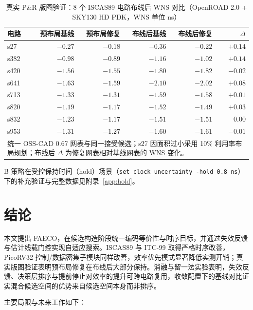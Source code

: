 \documentclass[journal]{IEEEtran}
\begin{document}
\begin{table}[!t]
\centering
\caption{真实 P\&R 版图验证：8 个 ISCAS89 电路布线后 WNS 对比（OpenROAD 2.0 + SKY130 HD PDK，WNS 单位 ns）}
\label{tab:pr8}
\footnotesize
\setlength{\tabcolsep}{2.5pt}
\begin{tabular}{lrrrrr}
\toprule
\textbf{电路} & \textbf{预布局基线} & \textbf{预布局修复} & \textbf{布线后基线} & \textbf{布线后修复} & $\Delta$ \\
\midrule
s27  & $-0.27$ & $-0.18$ & $-0.36$ & $-0.22$ & $+0.14$ \\
s382 & $-0.98$ & $-0.89$ & $-1.16$ & $-1.02$ & $+0.14$ \\
s420 & $-1.56$ & $-1.55$ & $-1.80$ & $-1.82$ & $-0.02$ \\
s641 & $-1.63$ & $-1.59$ & $-2.10$ & $-2.02$ & $+0.08$ \\
s713 & $-1.33$ & $-1.31$ & $-1.59$ & $-1.58$ & $+0.01$ \\
s820 & $-1.19$ & $-1.17$ & $-1.52$ & $-1.49$ & $+0.03$ \\
s832 & $-1.23$ & $-1.17$ & $-1.51$ & $-1.51$ & $0.00$ \\
s953 & $-1.31$ & $-1.27$ & $-1.60$ & $-1.61$ & $-0.01$ \\
\bottomrule
\multicolumn{6}{p{0.92\columnwidth}}{\footnotesize 统一 OSS-CAD 0.67 网表与同一接受候选；s27 因面积过小采用 10\% 利用率布局规划；布线后 $\Delta$ 为修复网表相对基线网表的 WNS 变化。}\\
\end{tabular}
\end{table}





B 策略在受控保持时间（hold）场景（\texttt{set\_clock\_uncertainty -hold 0.8\,ns}）下的补充验证与完整数据见附录~\ref{app:hold}。

\section{结论}\label{sec:conclusion}

本文提出 FAECO，在候选构造阶段统一编码等价性与时序目标，并通过失效反馈与估计线载门控实现自适应搜索。ISCAS89 与 ITC-99 取得严格时序改善，PicoRV32 控制/数据密集子模块同样改善，效率优先模式显著降低实测开销；真实版图验证表明预布局修复在布线后大部分保持。消融与留一法实验表明，失效反馈、决策层排序与提前停止对效率的提升可跨电路复用，收敛配置下的基线对比证实混合候选空间的优势来自候选空间本身而非排序。

主要局限与未来工作如下：
\end{document}
